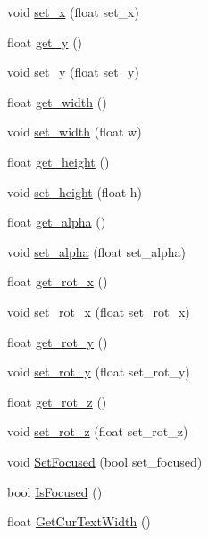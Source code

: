 \begin{DoxyCompactItemize}
void \hyperlink{class_n_g_u_i_label_ae24a66b242a2c707de28432462aec568}{set\+\_\+x} (float set\+\_\+x)
\item 
float \hyperlink{class_n_g_u_i_label_a962b729834fd29c5f0c51775b9547851}{get\+\_\+y} ()
\item 
void \hyperlink{class_n_g_u_i_label_a50e7dd1ae83454757e00d117a1622940}{set\+\_\+y} (float set\+\_\+y)
\item 
float \hyperlink{class_n_g_u_i_label_a26461134749f91eebc3fedccce08b69c}{get\+\_\+width} ()
\item 
void \hyperlink{class_n_g_u_i_label_a473eec25510bc4863b0729e4b69fee53}{set\+\_\+width} (float w)
\item 
float \hyperlink{class_n_g_u_i_label_a832f11c241e5f97e1f5dbb993743b228}{get\+\_\+height} ()
\item 
void \hyperlink{class_n_g_u_i_label_ac5a99ecea5089455f423693f70228218}{set\+\_\+height} (float h)
\item 
float \hyperlink{class_n_g_u_i_label_abc0873a704582c23992025a0eea675de}{get\+\_\+alpha} ()
\item 
void \hyperlink{class_n_g_u_i_label_a30f0d9a7f761b978558852fd6d15659d}{set\+\_\+alpha} (float set\+\_\+alpha)
\item 
float \hyperlink{class_n_g_u_i_label_aaa12c0604d78c8e42aed1dccb52b768e}{get\+\_\+rot\+\_\+x} ()
\item 
void \hyperlink{class_n_g_u_i_label_ad9261c783decf3beb777d15e4bf0f1c8}{set\+\_\+rot\+\_\+x} (float set\+\_\+rot\+\_\+x)
\item 
float \hyperlink{class_n_g_u_i_label_a4eb3430172116827dab67fccbf8738f7}{get\+\_\+rot\+\_\+y} ()
\item 
void \hyperlink{class_n_g_u_i_label_a954ee244917ad318051ebf16752cb0a0}{set\+\_\+rot\+\_\+y} (float set\+\_\+rot\+\_\+y)
\item 
float \hyperlink{class_n_g_u_i_label_a9604dc06969fd093ef524f893ce87fb8}{get\+\_\+rot\+\_\+z} ()
\item 
void \hyperlink{class_n_g_u_i_label_a4425a71dfc4e9ace165081c03dcddfd5}{set\+\_\+rot\+\_\+z} (float set\+\_\+rot\+\_\+z)
\item 
void \hyperlink{class_n_g_u_i_label_a02267fdb7c60e6d155f2b73d037111ca}{Set\+Focused} (bool set\+\_\+focused)
\item 
bool \hyperlink{class_n_g_u_i_label_a3302aab947fdeee8511498f42bb71449}{Is\+Focused} ()
\item 
float \hyperlink{class_n_g_u_i_label_a3443cdc96fe1f3d4a3dec5ed41d2c15e}{Get\+Cur\+Text\+Width} ()

\end{DoxyCompactItemize}
